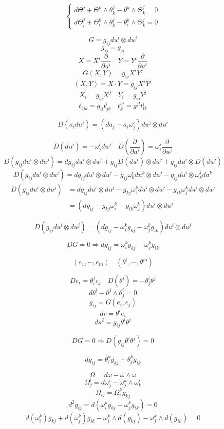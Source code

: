 \documentclass[12pt,a4paper]{article}
\begin{document}
\[
\begin{cases}
d\Theta^j + \Theta^k \wedge \theta^j_k - \theta^k \wedge \Theta^j_k = 0 \\
d\Theta^j_i+ \Theta^k_i \wedge \theta^j_k - \theta^k_i \wedge \Theta^j_k = 0
\end{cases}
\]

\[
G = g_{ij} du^i \otimes du^j
\]
\[
g_{ij} = g_{ji}
\]
\[
X = X^i \frac{\partial}{\partial u^i} \quad Y = Y^i \frac{\partial}{\partial u^i}
\]
\[
G(X,Y) = g_{ij}X^iY^j
\]
\[
(X,Y) = X \cdot Y = g_{ij}X^iY^j
\]
\[
X_i = g_{ij}X^j \quad Y_i = g_{ij}Y^j
\]
\[
t_{ijk} = g_{il}t^l_{jk} \quad t^{ij}_k = g^{jl}t^i_{lk}
\]

\[
D(a_idu^i) = (da_j-a_i\omega^i_j)du^j \otimes du^i
\]

\[
D(du^i) = -\omega^i_jdu^j \quad D(\frac{\partial}{\partial u^i}) = \omega^j_i\frac{\partial}{\partial u^j}
\]
\[
D(g_{ij} du^i \otimes du^j) = dg_{ij}du^i \otimes du^j + g_{ij}D(du^i)\otimes du^j + g_{ij} du^i \otimes D(du^j)
\]
\[
D(g_{ij} du^i \otimes du^j) = dg_{ij}du^i \otimes du^j - g_{ij}\omega^i_kdu^k\otimes du^j - g_{ij} du^i \otimes \omega^j_kdu^k
\]
\begin{align*}
D(g_{ij} du^i \otimes du^j) & = dg_{ij}du^i \otimes du^j - g_{kj}\omega^k_idu^i\otimes du^j - g_{ik} \omega^k_j du^i \otimes du^j \\
 & = (dg_{ij}- g_{kj}\omega^k_i - g_{ik} \omega^k_j )du^i \otimes du^j 
\end{align*}


\[
D(g_{ij} du^i \otimes du^j) = (dg_{ij} - \omega^k_i g_{kj} - \omega^k_j g_{ik}) du^i \otimes du^j
\]

\[
DG = 0 \Rightarrow dg_{ij} =  \omega^k_i g_{kj} + \omega^k_j g_{ik}
\]

\[
(e_1, \cdots ,e_m) \quad (\theta^1, \cdots, \theta^m)
\]

\[
De_i = \theta^j_i e_j \quad D(\theta^i) = -\theta^i_j\theta^j
\]
\[
d\theta^i - \theta^j \wedge \theta^i_j = 0
\]
\[
g_{ij} = G(e_i,e_j)
\]
\[
dr = \theta^ie_i
\]
\[
ds^2 = g_{ij} \theta^i \theta^j
\]

\[
DG = 0 \Rightarrow D( g_{ij} \theta^i \theta^j) = 0
\]

\[
dg_{ij} = \theta^k_ig_{kj} + \theta^k_jg_{ik}
\]

\[
\Omega = d\omega - \omega \wedge \omega
\]
\[
\Omega^i_j = d\omega^i_j -   \omega^k_j\wedge \omega^i_k
\]
\[
\Omega_{ij} = \Omega^k_i g_{kj}
\]
\[
d^2g_{ij} = d(\omega^k_ig_{kj} + \omega^k_jg_{ik}) = 0
\]
\[
d(\omega^k_i)g_{kj} + d(\omega^k_j)g_{ik} - \omega^k_i\wedge d(g_{kj}) - \omega^k_j \wedge d(g_{ik}) = 0
\]
\end{document}
